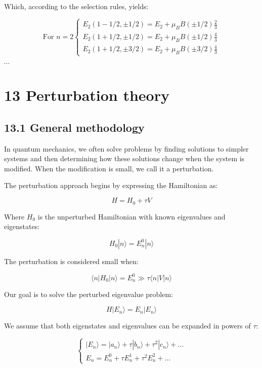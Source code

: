 \documentclass[italian]{HKNdocument}
\begin{document}
Which, according to the selection rules, yields:

\[
\text{For } n=2\left\{\begin{array}{l}
E_2(1-1/2,\pm 1/2)=E_2+\mu_B B(\pm 1/2)\frac{2}{3} \tag{12.59}\\
E_2(1+1/2,\pm 1/2)=E_2+\mu_B B(\pm 1/2)\frac{4}{3}\\
E_2(1+1/2,\pm 3/2)=E_2+\mu_B B(\pm 3/2)\frac{4}{3}
\end{array}\right.
\]

$\cdots$

\section*{13 Perturbation theory}
\subsection*{13.1 General methodology}
In quantum mechanics, we often solve problems by finding solutions to simpler systems and then determining how these solutions change when the system is modified. When the modification is small, we call it a perturbation.


The perturbation approach begins by expressing the Hamiltonian as:

\begin{equation*}
H=H_0+\tau V \tag{13.1}
\end{equation*}

Where $H_0$ is the unperturbed Hamiltonian with known eigenvalues and eigenstates:

\begin{equation*}
H_0|n\rangle=E_n^0|n\rangle \tag{13.2}
\end{equation*}

The perturbation is considered small when:

\begin{equation*}
\langle n|H_0|n\rangle=E_n^0 \gg \tau\langle n|V|n\rangle \tag{13.3}
\end{equation*}

Our goal is to solve the perturbed eigenvalue problem:

\begin{equation*}
H|E_n\rangle=E_n|E_n\rangle \tag{13.4}
\end{equation*}

We assume that both eigenstates and eigenvalues can be expanded in powers of $\tau$:

\[
\left\{\begin{array}{l}
|E_n\rangle=|a_n\rangle+\tau|b_n\rangle+\tau^2|c_n\rangle+\ldots \tag{13.5}\\
E_n=E_n^0+\tau E_n^1+\tau^2 E_n^2+\ldots
\end{array}\right.
\]
\end{document}
